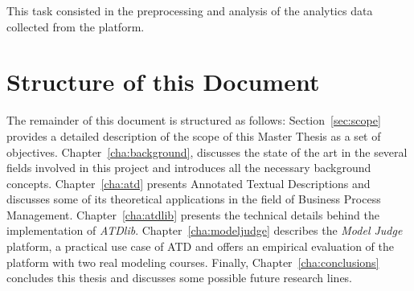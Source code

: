 This task consisted in the preprocessing and analysis of the analytics data
collected from the platform.






\section{Structure of this Document}

The remainder of this document is structured as follows: Section~\ref{sec:scope}
provides a detailed description of the scope of this Master Thesis as a set of
objectives. Chapter~\ref{cha:background}, discusses the state of the art in 
the several fields involved in this project and introduces all the necessary
background concepts. Chapter~\ref{cha:atd} presents Annotated Textual
Descriptions and discusses some of its theoretical applications in the field of
Business Process Management. Chapter~\ref{cha:atdlib} presents the technical
details behind the implementation of \emph{ATDlib}. Chapter~\ref{cha:modeljudge}
describes the \emph{Model Judge} platform, a practical use case of ATD and
offers an empirical evaluation of the platform with two real modeling courses.
Finally, Chapter~\ref{cha:conclusions} concludes this thesis and discusses some
possible future research lines.



